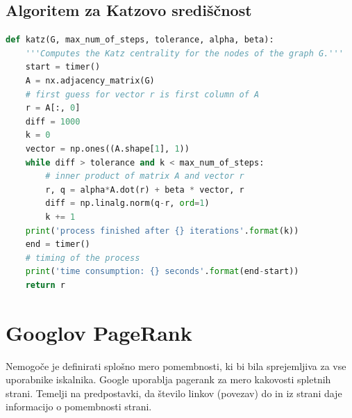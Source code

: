 \documentclass[a4paper]{article}
\begin{document}
\subsection{Algoritem za Katzovo središčnost}
\begin{lstlisting}[language=Python]
def katz(G, max_num_of_steps, tolerance, alpha, beta):
    '''Computes the Katz centrality for the nodes of the graph G.'''
    start = timer()
    A = nx.adjacency_matrix(G)
    # first guess for vector r is first column of A
    r = A[:, 0]  
    diff = 1000
    k = 0
    vector = np.ones((A.shape[1], 1))
    while diff > tolerance and k < max_num_of_steps:
        # inner product of matrix A and vector r
        r, q = alpha*A.dot(r) + beta * vector, r
        diff = np.linalg.norm(q-r, ord=1)
        k += 1
    print('process finished after {} iterations'.format(k))
    end = timer()
    # timing of the process
    print('time consumption: {} seconds'.format(end-start))
    return r
\end{lstlisting}


\section{Googlov PageRank}
\hspace{4.8mm}Nemogoče je definirati splošno mero pomembnosti, ki bi bila sprejemljiva za vse uporabnike iskalnika. Google uporablja pagerank za mero kakovosti spletnih strani. Temelji na predpostavki, da število linkov (povezav) do in iz strani daje informacijo o pomembnosti strani. \\
\end{document}
